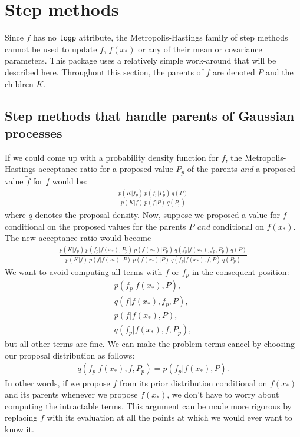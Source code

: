 \section{Step methods}
\label{sec:step-methods} 
Since $f$ has no \texttt{logp} attribute, the Metropolis-Hastings family of step methods cannot be used to update $f$, $f(x_*)$ or any of their mean or covariance parameters. This package uses a relatively simple work-around that will be described here. Throughout this section, the parents of $f$ are denoted $P$ and the children $K$.


\subsection{Step methods that handle parents of Gaussian processes}
If we could come up with a probability density function for $f$, the Metropolis-Hastings acceptance ratio for a proposed value $P_p$ of the parents \emph{and} a proposed value $\tilde f$ for $f$ would be:
\begin{eqnarray*}
    \frac{p(K|f_p)\ p(f_p|P_p)\ q(P)}{p(K|f)\ p(f|P)\ q(P_p)}
\end{eqnarray*}
where $q$ denotes the proposal density. Now, suppose we proposed a value for $f$ conditional on the proposed values for the parents $P$ \emph{and} conditional on $f(x_*)$. The new acceptance ratio would become
\begin{eqnarray*}
    \frac{p(K|f_p)\ p(f_p|f(x_*), P_p)\ p(f(x_*) | P_p)\ q(f_p|f(x_*),f_p, P_p)\ q(P)}{p(K|f)\ p(f|f(x_*), P)\ p(f(x_*) | P)\ q(f_p|f(x_*),f,P)\ q(P_p)}
\end{eqnarray*}
 We want to avoid computing all terms with $f$ or $f_p$ in the consequent position:
\begin{eqnarray*}
    p(f_p|f(x_*), P),\\ q(f|f(x_*),f_p,P),\\ p(f|f(x_*), P),\\ q(f_p|f(x_*),f,P_p),
\end{eqnarray*}
but all other terms are fine. We can make the problem terms cancel by choosing our proposal distribution as follows:
\begin{eqnarray*}
    q(f_p|f(x_*),f,P_p) = p(f_p|f(x_*), P).
\end{eqnarray*}
In other words, if we propose $f$ from its prior distribution conditional on $f(x_*)$ and its parents whenever we propose $f(x_*)$, we don't have to worry about computing the intractable terms. This argument can be made more rigorous by replacing $f$ with its evaluation at all the points at which we would ever want to know it.

